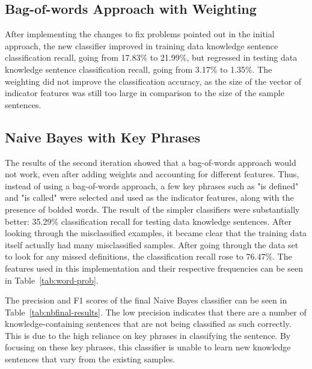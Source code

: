 \documentclass{article} %
\begin{document}
\subsection{Bag-of-words Approach with Weighting}

After implementing the changes to fix problems pointed out in the initial approach, the new classifier improved in training data knowledge sentence classification recall, going from 17.83\% to 21.99\%, but regressed in testing data knowledge sentence classification recall, going from 3.17\% to 1.35\%. The weighting did not improve the classification accuracy, as the size of the vector of indicator features was still too large in comparison to the size of the sample sentences.

\subsection{Naive Bayes with Key Phrases}

The results of the second iteration showed that a bag-of-words approach would not work, even after adding weights and accounting for different features. Thus, instead of using a bag-of-words approach, a few key phrases such as "is defined" and "is called" were selected and used as the indicator features, along with the presence of bolded words. The result of the simpler classifiers were substantially better: 35.29\% classification recall for testing data knowledge sentences. After looking through the misclassified examples, it became clear that the training data itself actually had many misclassified samples. After going through the data set to look for any missed definitions, the classification recall rose to 76.47\%. The features used in this implementation and their respective frequencies can be seen in Table~\ref{tab:word-prob}.

The precision and F1 scores of the final Naive Bayes classifier can be seen in Table~\ref{tab:nbfinal-results}. The low precision indicates that there are a number of knowledge-containing sentences that are not being classified as such correctly. This is due to the high reliance on key phrases in classifying the sentence. By focusing on these key phrases, this classifier is unable to learn new knowledge sentences that vary from the existing samples.
\end{document}
